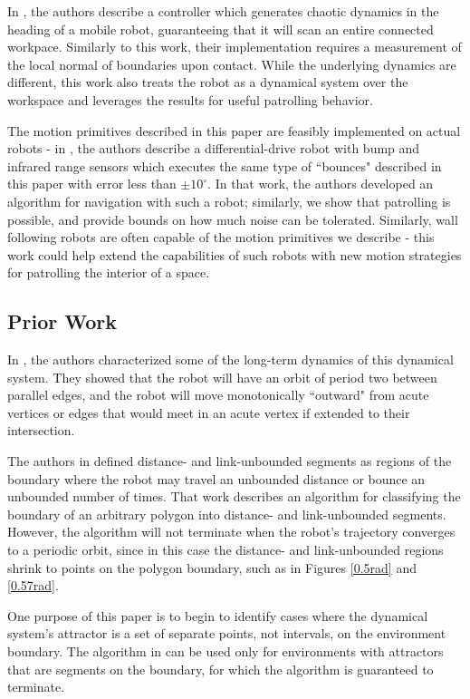 \documentclass[letterpaper, 10 pt, conference]{ieeeconf}  %
\begin{document}
In \cite{nakamura2001chaotic}, the authors describe a
controller which generates chaotic dynamics in the heading of a mobile robot,
guaranteeing that it will scan an entire connected workpace.
Similarly to this work, their implementation requires a measurement of
the local normal of boundaries upon contact. While the underlying dynamics are
different, this work also treats the robot as a dynamical system over
the workspace and leverages the results for useful patrolling behavior.

The motion primitives described in this paper are feasibly implemented on
actual robots - in \cite{LewOKa13}, the authors describe a differential-drive robot with bump and infrared
range sensors
which executes the same type of ``bounces" described in this paper with error less
than $\pm 10^{\circ}$. In that work, the authors developed an algorithm for navigation with such a
robot; similarly,
we show that patrolling is possible, and provide bounds on how much noise can be
tolerated. Similarly, wall following robots \cite{Carelli2003,Lamp05} are often capable of the
motion primitives we describe - this work could help extend the capabilities of such
robots with new motion strategies for patrolling the interior of a space.

\subsection{Prior Work}

In \cite{bounce}, the authors
characterized some of the long-term dynamics of this dynamical system. They
showed that the robot will have an orbit of period two between parallel edges,
and the robot will move monotonically ``outward" from acute vertices or edges
that would meet in an acute vertex if extended to their intersection.

The authors in \cite{bounce} defined distance- and link-unbounded
segments as regions of the boundary where the robot may
travel an unbounded distance or bounce an unbounded number of times. That work describes an algorithm for classifying the
 boundary of an arbitrary polygon into distance- and link-unbounded segments. 
 However, the algorithm will not terminate when the robot's trajectory converges 
 to a periodic orbit, since in this case the distance- and link-unbounded regions shrink to points on the polygon boundary, such as in Figures \ref{0.5rad} and \ref{0.57rad}.

One purpose of this paper is to begin to identify cases where the dynamical system's attractor is a set of separate points, not intervals, on
the environment boundary. The
algorithm in \cite{bounce} can be used only for environments with attractors that are
segments on the boundary, for which the algorithm is guaranteed to terminate.
\end{document}
